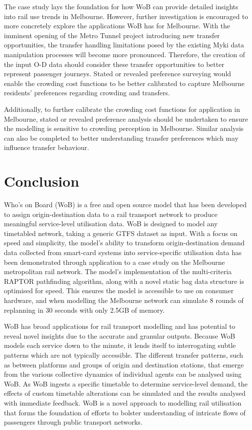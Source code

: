 The case study lays the foundation for how WoB can provide detailed insights into rail use trends in Melbourne. However, further investigation is encouraged to more concretely explore the applications WoB has for Melbourne. With the imminent opening of the Metro Tunnel project introducing new transfer opportunities, the transfer handling limitations posed by the existing Myki data manipulation processes will become more pronounced. Therefore, the creation of the input O-D data should consider these transfer opportunities to better represent passenger journeys. Stated or revealed preference surveying would enable the crowding cost functions to be better calibrated to capture Melbourne residents' preferences regarding crowding and transfers. 

Additionally, to further calibrate the crowding cost functions for application in Melbourne, stated or revealed preference analysis should be undertaken to ensure the modelling is sensitive to crowding perception in Melbourne. Similar analysis can also be completed to better understanding transfer preferences which may influence transfer behaviour. 

\section{Conclusion}
Who's on Board (WoB) is a free and open source model that has been developed to assign origin-destination data to a rail transport network to produce meaningful service-level utilisation data. WoB is designed to model any timetabled network, taking a generic GTFS dataset as input. With a focus on speed and simplicity, the model's ability to transform origin-destination demand data collected from smart-card systems into service-specific utilisation data has been demonstrated through application to a case study on the Melbourne metropolitan rail network. The model's implementation of the multi-criteria RAPTOR pathfinding algorithm, along with a novel static bag data structure is optimised for speed. This ensures the model is accessible to use on consumer hardware, and when modelling the Melbourne network can simulate 8 rounds of replanning in 30 seconds with only 2.5GB of memory. 

WoB has broad applications for rail transport modelling and has potential to reveal novel insights due to the accurate and granular outputs. Because WoB models each service down to the minute, it lends itself to interrogating subtle patterns which are not typically accessible. The different transfer patterns, such as between platforms and groups of origin and destination stations, that emerge from the various collective dynamics of individual agents can be analysed using WoB. As WoB ingests a specific timetable to determine service-level demand, the effects of custom timetable alterations can be simulated and the results analysed with immediate feedback. WoB is a novel approach to modelling rail utilisation that forms the foundation of efforts to bolster understanding of intricate flows of passengers through public transport networks. 
